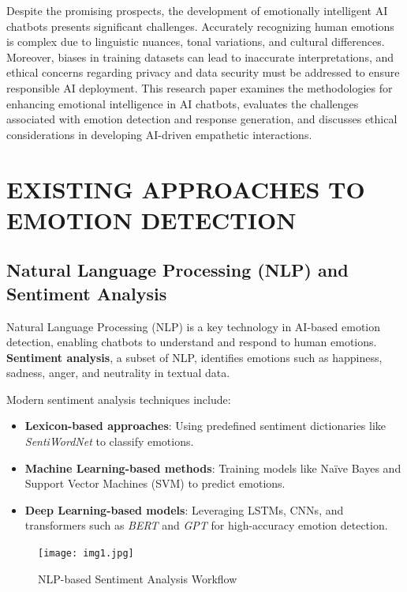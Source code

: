 \documentclass[a4paper,10pt]{article}
\begin{document}
\noindent Despite the promising prospects, the development of emotionally intelligent AI chatbots presents significant challenges. Accurately recognizing human emotions is complex due to linguistic nuances, tonal variations, and cultural differences. Moreover, biases in training datasets can lead to inaccurate interpretations, and ethical concerns regarding privacy and data security must be addressed to ensure responsible AI deployment. This research paper examines the methodologies for enhancing emotional intelligence in AI chatbots, evaluates the challenges associated with emotion detection and response generation, and discusses ethical considerations in developing AI-driven empathetic interactions.


\section{EXISTING APPROACHES TO EMOTION DETECTION}

\subsection{Natural Language Processing (NLP) and Sentiment Analysis}

Natural Language Processing (NLP) is a key technology in AI-based emotion detection, enabling chatbots to understand and respond to human emotions. \textbf{Sentiment analysis}, a subset of NLP, identifies emotions such as happiness, sadness, anger, and neutrality in textual data.

Modern sentiment analysis techniques include:

\begin{itemize}
    \item \textbf{Lexicon-based approaches}: Using predefined sentiment dictionaries like \textit{SentiWordNet} to classify emotions.
    \item \textbf{Machine Learning-based methods}: Training models like Naïve Bayes and Support Vector Machines (SVM) to predict emotions.
    \item \textbf{Deep Learning-based models}: Leveraging LSTMs, CNNs, and transformers such as \textit{BERT} and \textit{GPT} for high-accuracy emotion detection.
\end{itemize}

\begin{figure}[h]
    \centering
    \texttt{[image: img1.jpg]}
    \caption{NLP-based Sentiment Analysis Workflow}
\end{figure}
\end{document}
